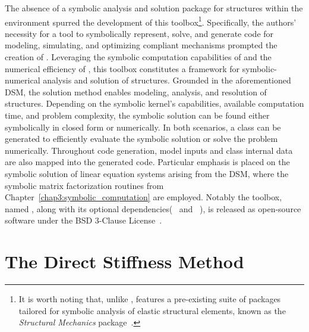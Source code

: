 The absence of a symbolic analysis and solution package for structures within the \Maple{} environment spurred the development of this toolbox\footnote{It is worth noting that, unlike \Maple{}, \Mathematica{} features a pre-existing suite of packages tailored for symbolic analysis of elastic structural elements, known as the \emph{Structural Mechanics} package~\cite{structuralmechanics}.}. Specifically, the authors' necessity for a tool to symbolically represent, solve, and generate code for modeling, simulating, and optimizing compliant mechanisms prompted the creation of \TrussMe{}. Leveraging the symbolic computation capabilities of \Maple{} and the numerical efficiency of \Matlab{}, this toolbox constitutes a framework for symbolic-numerical analysis and solution of structures. Grounded in the aforementioned \ac{DSM}, the solution method enables modeling, analysis, and resolution of structures. Depending on the symbolic kernel's capabilities, available computation time, and problem complexity, the symbolic solution can be found either symbolically in closed form or numerically. In both scenarios, a \Matlab{} class can be generated to efficiently evaluate the symbolic solution or solve the problem numerically. Throughout code generation, model inputs and class internal data are also mapped into the generated code. Particular emphasis is placed on the symbolic solution of linear equation systems arising from the \ac{DSM}, where the symbolic matrix factorization routines from Chapter~\ref{chap3:symbolic_computation} are employed. Notably the toolbox, named \TrussMe{}, along with its optional dependencies(\LEM{}~\cite{lem} and \LAST{}~\cite{last}), is released as open-source software under the BSD 3-Clause License~\cite{trussme}.


\section{The Direct Stiffness Method}
\label{app4:sec:solution_method}

